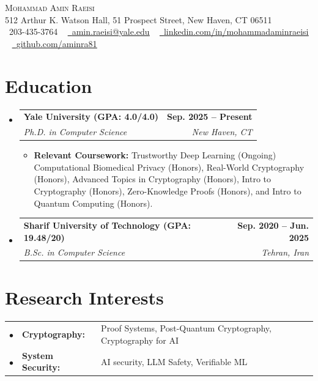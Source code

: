 \documentclass[letterpaper,11pt]{article}
\makeatletter
\newcommand{\resumeItem}[1]{
  \item\small{{#1 \vspace{-2pt}}}
}
\newcommand{\resumeSubheading}[4]{
  \vspace{-2pt}\item
    \begin{tabular*}{1.0\textwidth}[t]{l@{\extracolsep{\fill}}r}
      \textbf{#1} & \textbf{\small #2} \\
      \textit{\small #3} & \textit{\small #4} \\
    \end{tabular*}\vspace{-7pt}
}
\newcommand{\resumeSubHeadingListStart}{\begin{itemize}[leftmargin=0.0in, label={}]}
\newcommand{\resumeSubHeadingListEnd}{\end{itemize}}
\newcommand{\resumeItemListStart}{\begin{itemize}}
\newcommand{\resumeItemListEnd}{\end{itemize}\vspace{-5pt}}
\makeatother
\begin{document}
\begin{center}
    {\Huge \scshape Mohammad Amin Raeisi} \\ \vspace{1pt}
    512 Arthur K. Watson Hall, 51 Prospect Street, New Haven, CT 06511 \\ \vspace{1pt}
    \small
    \raisebox{-0.1\height}\faPhone\ 203-435-3764 ~
    \href{mailto:amin.raeisi@yale.edu}{\raisebox{-0.2\height}\faEnvelope\ \underline{amin.raeisi@yale.edu}} ~
    \href{https://www.linkedin.com/in/mohammadaminraeisi}{\raisebox{-0.2\height}\faLinkedin\ \underline{linkedin.com/in/mohammadaminraeisi}} ~
    \href{https://github.com/aminra81}{\raisebox{-0.2\height}\faGithub\ \underline{github.com/aminra81}}
    \vspace{-8pt}
\end{center}

\section{Education}
  \resumeSubHeadingListStart

    \resumeSubheading
      {Yale University (GPA: 4.0/4.0)}{Sep. 2025 -- Present}
      {Ph.D. in Computer Science}{New Haven, CT}
      \resumeItemListStart
        \resumeItem{\textbf{Relevant Coursework:} 
        Trustworthy Deep Learning (Ongoing)
        Computational Biomedical Privacy (Honors), Real-World Cryptography (Honors), Advanced Topics in Cryptography (Honors), Intro to Cryptography (Honors), Zero-Knowledge Proofs (Honors), and Intro to Quantum Computing (Honors).}
      \resumeItemListEnd

    \resumeSubheading
      {Sharif University of Technology (GPA: 19.48/20)}{Sep. 2020 -- Jun. 2025}
      {B.Sc. in Computer Science}{Tehran, Iran}

  \resumeSubHeadingListEnd

\section{Research Interests}

{\small
\begin{tabularx}{\textwidth}{@{}p{} p{} X@{}}
$\bullet$ & \textbf{Cryptography:} & Proof Systems, Post-Quantum Cryptography, Cryptography for AI \\[-2pt]
$\bullet$ & \textbf{System Security:} & AI security, LLM Safety, Verifiable ML
\end{tabularx}
}
\vspace{-15pt}
\end{document}
